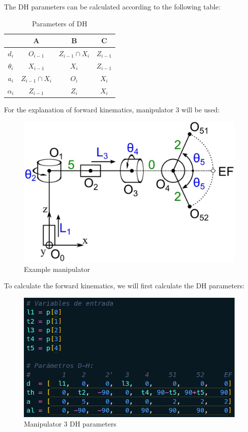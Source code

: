 \documentclass[11pt]{report}
\begin{document}
The DH parameters can be calculated according to the following table:
\begin{table}[H]
  \centering
  \begin{tabular}{|c|c|c|c|}
    \hline
    \textbf{}           & \textbf{A}                 & \textbf{B}                 & \textbf{C}         \\ \hline
    \textbf{$d_i$}      & \texttt{$O_{i-1}$}         & \texttt{$Z_{i-1}\cap X_i$} & \texttt{$Z_{i-1}$} \\ \hline
    \textbf{$\theta_i$} & \texttt{$X_{i-1}$}         & \texttt{$X_{i}$}           & \texttt{$Z_{i-1}$} \\ \hline
    \textbf{$a_i$}      & \texttt{$Z_{i-1}\cap X_i$} & \texttt{$O_{i}$}           & \texttt{$X_{i}$}   \\ \hline
    \textbf{$\alpha_i$} & \texttt{$Z_{i-1}$}         & \texttt{$Z_{i}$}           & \texttt{$X_{i}$}   \\ \hline
  \end{tabular}
  \caption{Parameters of DH}
\end{table}

For the explanation of forward kinematics, manipulator 3 will be used:
\begin{figure}[H]
  \centering
  \includegraphics[scale=0.24]{img/manipulador.png}
  \caption{Example manipulator}
\end{figure}

To calculate the forward kinematics, we will first calculate the DH parameters:
\begin{figure}[H]
  \centering
  \includegraphics[scale=0.4]{img/parametros_dh.png}
  \caption{Manipulator 3 DH parameters}
\end{figure}
\end{document}
